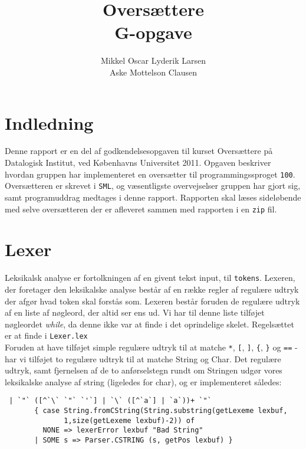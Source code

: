 \documentclass[12pt]{article}
\begin{document}
\author{Mikkel Oscar Lyderik Larsen \\ Aske Mottelson Clausen}
\title{Oversættere \\ G-opgave}
\maketitle

\thispagestyle{empty}
\newpage



\tableofcontents

\section*{Indledning}
Denne rapport er en del af godkendelsesopgaven til kurset Oversættere på Datalogisk Institut, ved Københavns Universitet 2011. Opgaven beskriver hvordan gruppen har implementeret en oversætter til programmingssproget \texttt{100}. Oversætteren er skrevet i \texttt{SML}, og væsentligste overvejselser gruppen har gjort sig, samt programuddrag medtages i denne rapport. Rapporten skal læses sideløbende med selve oversætteren der er afleveret sammen med rapporten i en \texttt{zip} fil.

\section{Lexer}
Leksikalsk analyse er fortolkningen af en givent tekst input, til \texttt{tokens}. Lexeren, der foretager den leksikalske analyse består af en række regler af regulære udtryk der afgør hvad token skal forstås som. Lexeren består foruden de regulære udtryk af en liste af nøgleord, der altid ser ens ud. Vi har til denne liste tilføjet nøgleordet \textit{while}, da denne ikke var at finde i det oprindelige skelet. Regelsættet er at finde i \texttt{Lexer.lex}\\
Foruden at have tilføjet simple regulære udtryk til at matche \texttt{*}, \texttt{[}, \texttt{]}, \texttt{\{}, \texttt{\}} og \texttt{==} - har vi tilføjet to regulære udtryk til at matche String og Char. Det regulære udtryk, samt fjernelsen af de to anførselstegn rundt om Stringen udgør vores leksikalske analyse af string (ligeledes for char), og er implementeret således:\\

\begin{verbatim}
 | `"` ([^`\` `"` `'`] | `\` ([^`a`] | `a`))+ `"`
       { case String.fromCString(String.substring(getLexeme lexbuf,
              1,size(getLexeme lexbuf)-2)) of
         NONE => lexerError lexbuf "Bad String"
       | SOME s => Parser.CSTRING (s, getPos lexbuf) }
\end{verbatim}	 
    
\end{document}

